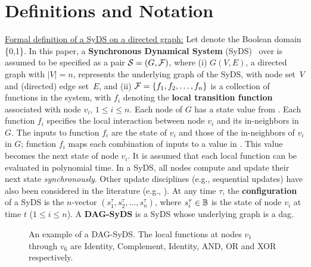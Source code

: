\section{Definitions and Notation}
\label{sec:defs}

\noindent
\underline{\textsf{Formal definition of a SyDS on a directed graph:}}
Let \bbb{} denote the Boolean domain \{0,1\}.
In this paper, a \textbf{Synchronous Dynamical System} (SyDS)~
\cals{} over \bbb{} is assumed to be specified as
a pair ${\mbox{$\mathcal{S}$}}  = (G, {\mbox{$\mathcal{F}$}})$, where
(i) $G(V,E)$, a directed graph with $|V| = n$,
represents the underlying graph of the SyDS,
with node set~$V$ and (directed) edge set~$E$, and
(ii) ${\mbox{$\mathcal{F}$}} = \{f_1, f_2, \ldots, f_n \}$ is a collection of
functions in the system, with
$f_i$ denoting the \textbf{local transition
function} associated with node $v_i$, $1 \leq i \leq n$.
Each node of $G$ has a state value from \bbb.
Each function $f_i$ specifies the local interaction
between node $v_i$ and its in-neighbors in $G$.
The inputs to function $f_i$ are the state of $v_i$ and
those of the in-neighbors of $v_i$ in $G$;
function $f_i$ maps
each combination of inputs to a value in \bbb.
This value becomes the next state of node $v_i$.
It is assumed that each local function can be evaluated in
polynomial time.
In a SyDS, all nodes compute and update their next state
\emph{synchronously}.
Other update disciplines (e.g., sequential updates)
have also been considered in the literature (e.g., \cite{MR-2007}).
At any time $\tau$,
the {\bf configuration} \calc{} of a SyDS
is the $n$-vector $(s_1^{\tau}, s_2^{\tau}, \ldots, s_n^{\tau})$,
where $s_i^{\tau} \in \mbox{$\mathbb{B}$}$ is the state of
node $v_i$ at time $t$ ($1 \leq i \leq n$).
A \textbf{DAG-SyDS} is a SyDS whose underlying graph is a dag.

\begin{figure}
\begin{center}

\end{center}
\caption{An example of a DAG-SyDS.
The local functions at nodes $v_1$ through
$v_6$ are Identity, Complement, Identity, AND, OR and
XOR respectively.}
\label{fig:ex_dag_syds}
\end{figure}

\smallskip

